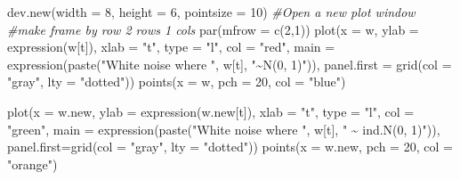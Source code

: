 \documentclass[
]{book}
\newenvironment{Shaded}{\begin{snugshade}}{\end{snugshade}}
\newcommand{\AttributeTok}[1]{\textcolor[rgb]{0.77,0.63,0.00}{#1}}
\newcommand{\CommentTok}[1]{\textcolor[rgb]{0.56,0.35,0.01}{\textit{#1}}}
\newcommand{\DecValTok}[1]{\textcolor[rgb]{0.00,0.00,0.81}{#1}}
\newcommand{\FunctionTok}[1]{\textcolor[rgb]{0.00,0.00,0.00}{#1}}
\newcommand{\NormalTok}[1]{#1}
\newcommand{\StringTok}[1]{\textcolor[rgb]{0.31,0.60,0.02}{#1}}
\theoremstyle{definition}
\theoremstyle{definition}
\theoremstyle{definition}
\theoremstyle{definition}
\theoremstyle{remark}
\begin{document}
\begin{Shaded}
\begin{Highlighting}[]
\FunctionTok{dev.new}\NormalTok{(}\AttributeTok{width =} \DecValTok{8}\NormalTok{, }\AttributeTok{height =} \DecValTok{6}\NormalTok{, }\AttributeTok{pointsize =} \DecValTok{10}\NormalTok{) }\CommentTok{\#Open a new plot window}
\CommentTok{\#make frame by row 2 rows 1 cols}
\FunctionTok{par}\NormalTok{(}\AttributeTok{mfrow =} \FunctionTok{c}\NormalTok{(}\DecValTok{2}\NormalTok{,}\DecValTok{1}\NormalTok{))}
\FunctionTok{plot}\NormalTok{(}\AttributeTok{x =}\NormalTok{ w, }\AttributeTok{ylab =} \FunctionTok{expression}\NormalTok{(w[t]), }\AttributeTok{xlab =} \StringTok{"t"}\NormalTok{, }\AttributeTok{type =} 
      \StringTok{"l"}\NormalTok{, }\AttributeTok{col =} \StringTok{"red"}\NormalTok{, }\AttributeTok{main =} \FunctionTok{expression}\NormalTok{(}\FunctionTok{paste}\NormalTok{(}\StringTok{"White noise where "}\NormalTok{, w[t], }\StringTok{"\textasciitilde{}N(0, 1)"}\NormalTok{)), }\AttributeTok{panel.first =} 
      \FunctionTok{grid}\NormalTok{(}\AttributeTok{col =} \StringTok{"gray"}\NormalTok{, }\AttributeTok{lty =} \StringTok{"dotted"}\NormalTok{))}
\FunctionTok{points}\NormalTok{(}\AttributeTok{x =}\NormalTok{ w, }\AttributeTok{pch =} \DecValTok{20}\NormalTok{, }\AttributeTok{col =} \StringTok{"blue"}\NormalTok{)}


\FunctionTok{plot}\NormalTok{(}\AttributeTok{x =}\NormalTok{ w.new, }\AttributeTok{ylab =} \FunctionTok{expression}\NormalTok{(w.new[t]), }\AttributeTok{xlab =} 
      \StringTok{"t"}\NormalTok{, }\AttributeTok{type =} \StringTok{"l"}\NormalTok{, }\AttributeTok{col =} \StringTok{"green"}\NormalTok{, }\AttributeTok{main =} 
      \FunctionTok{expression}\NormalTok{(}\FunctionTok{paste}\NormalTok{(}\StringTok{"White noise where "}\NormalTok{, w[t], }\StringTok{" \textasciitilde{} ind.N(0, 1)"}\NormalTok{)), }\AttributeTok{panel.first=}\FunctionTok{grid}\NormalTok{(}\AttributeTok{col =} \StringTok{"gray"}\NormalTok{, }\AttributeTok{lty =} 
      \StringTok{"dotted"}\NormalTok{))}
\FunctionTok{points}\NormalTok{(}\AttributeTok{x =}\NormalTok{ w.new, }\AttributeTok{pch =} \DecValTok{20}\NormalTok{, }\AttributeTok{col =} \StringTok{"orange"}\NormalTok{)}
\end{Highlighting}
\end{Shaded}
\end{document}
